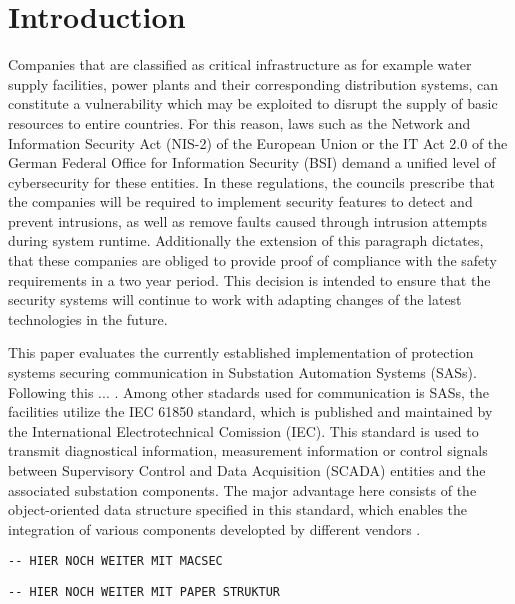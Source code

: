 \documentclass[conference]{IEEEtran}
\begin{document}
\section{Introduction}
\noindent Companies that are classified as critical infrastructure as for example water supply facilities, power plants and their corresponding 
distribution systems, can constitute a vulnerability which may be exploited to disrupt the supply of basic resources to entire countries. For this reason, 
laws such as the Network and Information Security Act (NIS-2) \cite{NIS-2:2022} of the European Union or the IT Act 2.0 \cite{IT-Gesetz_2:2021} of the 
German Federal Office for Information Security (BSI) demand a unified level of cybersecurity for these entities. In these regulations, the councils 
prescribe that the companies will be required to implement security features to detect and prevent intrusions, as well as remove faults caused through 
intrusion attempts during system runtime. \cite[§11 (1d)]{IT-Gesetz_2:2021} Additionally the extension of this paragraph dictates, that these companies 
are obliged to provide proof of compliance with the safety requirements in a two year period. \cite[§11 (1e)]{IT-Gesetz_2:2021} This decision is intended 
to ensure that the security systems will continue to work with adapting changes of the latest technologies in the future. 

\smallskip
This paper evaluates the currently established implementation of protection systems securing communication in Substation Automation Systems (SASs). 
Following this ... . Among other stadards used for communication is SASs, the facilities utilize the IEC 61850 standard, which is published and maintained by the International Electrotechnical Comission 
(IEC). This standard is used to transmit diagnostical information, measurement information or control signals between Supervisory Control and Data 
Acquisition (SCADA) entities and the associated substation components. The major advantage here consists of the object-oriented data structure specified 
in this standard, which enables the integration of various components developted by different vendors \cite[p. 5643]{Review_IEC62351:2019}. 

\begin{verbatim}
-- HIER NOCH WEITER MIT MACSEC
\end{verbatim}

\begin{verbatim}
-- HIER NOCH WEITER MIT PAPER STRUKTUR
\end{verbatim}
\end{document}
